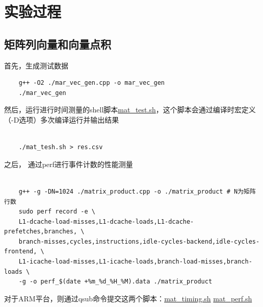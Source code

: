 \documentclass[a4paper]{article}
\begin{document}
\section{实验过程}

\subsection{矩阵列向量和向量点积}

首先，生成测试数据

\begin{verbatim}
    g++ -O2 ./mar_vec_gen.cpp -o mar_vec_gen
    ./mar_vec_gen
\end{verbatim}

然后，运行进行时间测量的shell脚本\href{https://github.com/suhipek/NKU_parallel_programming/blob/main/2_cache_superscalar_profiling/mat_test.sh}{mat\_test.sh}，这个脚本会通过编译时宏定义（-D选项）多次编译运行并输出结果
\begin{verbatim}
    
    ./mat_tesh.sh > res.csv
\end{verbatim}

之后， 通过perf进行事件计数的性能测量
\begin{verbatim}
               
    g++ -g -DN=1024 ./matrix_product.cpp -o ./matrix_product # N为矩阵行数
    sudo perf record -e \
    L1-dcache-load-misses,L1-dcache-loads,L1-dcache-prefetches,branches, \
    branch-misses,cycles,instructions,idle-cycles-backend,idle-cycles-frontend, \
    L1-icache-load-misses,L1-icache-loads,branch-load-misses,branch-loads \
    -g -o perf_$(date +%m_%d_%H_%M).data ./matrix_product
\end{verbatim}

对于ARM平台，则通过qsub命令提交这两个脚本：\href{https://github.com/suhipek/NKU_parallel_programming/blob/main/2_cache_superscalar_profiling/mat_timing.sh}{mat\_timing.sh} 
\href{https://github.com/suhipek/NKU_parallel_programming/blob/main/2_cache_superscalar_profiling/mat_perf.sh}{mat\_perf.sh}
\end{document}
